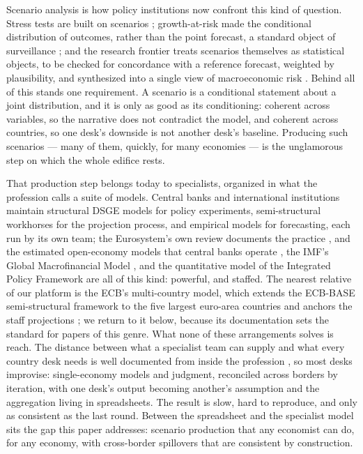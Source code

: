 \documentclass[11pt]{article}
\begin{document}
Scenario analysis is how policy institutions now confront this kind of question. Stress
tests are built on scenarios \citep{AdrianMorsinkSchumacher2020}; growth-at-risk made the
conditional distribution of outcomes, rather than the point forecast, a standard object of
surveillance \citep{AdrianBoyarchenkoGiannone2019}; and the research frontier treats
scenarios themselves as statistical objects, to be checked for concordance with a reference
forecast, weighted by plausibility, and synthesized into a single view of macroeconomic risk
\citep{AdrianGiannoneLucianiWest2025}. Behind all of this stands one requirement. A scenario
is a conditional statement about a joint distribution, and it is only as good as its
conditioning: coherent across variables, so the narrative does not contradict the model, and
coherent across countries, so one desk's downside is not another desk's baseline. Producing
such scenarios --- many of them, quickly, for many economies --- is the unglamorous step on
which the whole edifice rests.

That production step belongs today to specialists, organized in what the profession calls a
suite of models. Central banks and international institutions maintain structural DSGE
models for policy experiments, semi-structural workhorses for the projection process, and
empirical models for forecasting, each run by its own team; the Eurosystem's own review
documents the practice \citep{DarracqPariesEtAl2021}, and the estimated open-economy models
that central banks operate \citep{AdolfsonLaseenLindeVillani2007}, the IMF's Global
Macrofinancial Model \citep{Vitek2018}, and the quantitative model of the Integrated Policy
Framework \citep{AdrianErcegLindeZabczykZhou2020} are all of this kind: powerful, and
staffed. The nearest relative of our platform is the ECB's multi-country model, which
extends the ECB-BASE semi-structural framework to the five largest euro-area countries and
anchors the staff projections \citep{AngeliniBokanChristoffelCiccarelliZimic2019,
AngeliniBokanCiccarelliLalikZimic2025}; we return to it below, because its documentation
sets the standard for papers of this genre. What none of these arrangements solves is
reach. The distance between what a specialist team can supply and what every country desk
needs is well documented from inside the profession \citep{LindeSmetsWouters2016}, so most
desks improvise: single-economy models and judgment, reconciled across borders by
iteration, with one desk's output becoming another's assumption and the aggregation living
in spreadsheets. The result is slow, hard to reproduce, and only as consistent as the last
round. Between the spreadsheet and the specialist model sits the gap this paper addresses:
scenario production that any economist can do, for any economy, with cross-border
spillovers that are consistent by construction.
\end{document}
